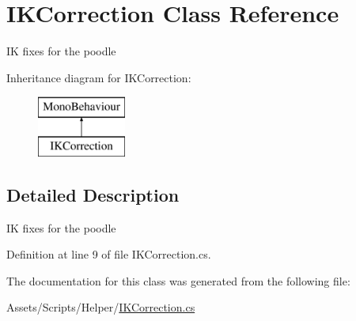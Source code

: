 \hypertarget{class_i_k_correction}{}\section{I\+K\+Correction Class Reference}
\label{class_i_k_correction}


IK fixes for the poodle  


Inheritance diagram for I\+K\+Correction\+:\begin{figure}[H]
\begin{center}
\leavevmode
\includegraphics[height=2.000000cm]{class_i_k_correction}
\end{center}
\end{figure}


\subsection{Detailed Description}
IK fixes for the poodle 



Definition at line 9 of file I\+K\+Correction.\+cs.



The documentation for this class was generated from the following file\+:\begin{DoxyCompactItemize}
\item 
Assets/\+Scripts/\+Helper/\mbox{\hyperlink{_i_k_correction_8cs}{I\+K\+Correction.\+cs}}\end{DoxyCompactItemize}
